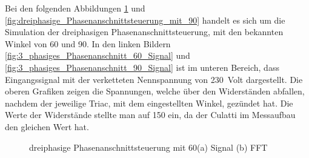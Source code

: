 Bei den folgenden Abbildungen \ref{fig:dreiphasige_Phasenanschnittsteuerung_mit_60} und \ref{fig:dreiphasige_Phasenanschnittsteuerung_mit_90} handelt es sich um die Simulation der dreiphasigen Phasenanschnittsteuerung, mit den bekannten Winkel von 60\textdegree\hspace{0.02cm} und 90\textdegree\hspace{0.02cm}.
In den linken Bildern \ref{fig:3_phasiges_Phasenanschnitt_60_Signal} und \ref{fig:3_phasiges_Phasenanschnitt_90_Signal} ist im  unteren Bereich, dass Eingangssignal mit der verketteten Nennspannung von \SI{230}{Volt} dargestellt. Die oberen Grafiken zeigen die Spannungen, welche über den Widerständen abfallen, nachdem der jeweilige Triac, mit dem eingestellten Winkel, gezündet hat. Die Werte der Widerstände stellte man auf \SI{150}{\Omega} ein, da der Culatti im Messaufbau den gleichen Wert hat. 

\begin{figure}[ht!]
	\centering
	\qquad
	\caption{dreiphasige Phasenanschnittsteuerung mit 60\textdegree (a) Signal (b) FFT}
	\label{fig:dreiphasige_Phasenanschnittsteuerung_mit_60}
\end{figure}


